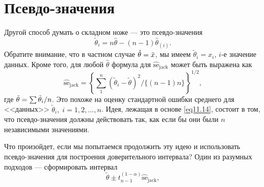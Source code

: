 \section{Псевдо-значения}

Другой способ думать о складном ноже --- это псевдо-значения
\begin{equation}\label{eq11.14}
    \widetilde{\theta}_{i} = n\hat{\theta} - (n-1)\hat{\theta}_{(i)}.
\end{equation}
Обратите внимание, что в частном случае $\hat{\theta} = \Bar{x}$, мы имеем $\widetilde{\theta}_{i} = x_{i}$, $i$-е значение данных. Кроме того, для любой $\hat{\theta}$ формула для $\widehat{\text{se}}_{\text{jack}}$ может быть выражена как
\begin{equation}\label{eq11.15}
    \widehat{\text{se}}_{\text{jack}} = \left\{\sum\limits_{1}^{n}\left(\tilde{\theta}_{i} - \tilde{\theta}\right)^2/\{(n-1)n\}\right\}^{1/2},
\end{equation}
где $\Tilde{\theta} = \sum\tilde{\theta}_{i}/n$. Это похоже на оценку стандартной ошибки среднего для <<данных>> $\tilde{\theta}_{i},\; i = 1, 2, \dots, n$. Идея, лежащая в основе \ref{eq11.14}, состоит в том, что псевдо-значения должны действовать так, как если бы они были $n$ независимыми значениями.

Что произойдет, если мы попытаемся продолжить эту идею и использовать псевдо-значения для построения доверительного интервала? Один из разумных подходов --- сформировать интервал
\begin{equation}\label{eq11.16}
    \widetilde{\theta} \pm t_{n-1}^{(1-\alpha)}\widehat{\text{se}}_{\text{jack}},
\end{equation}

